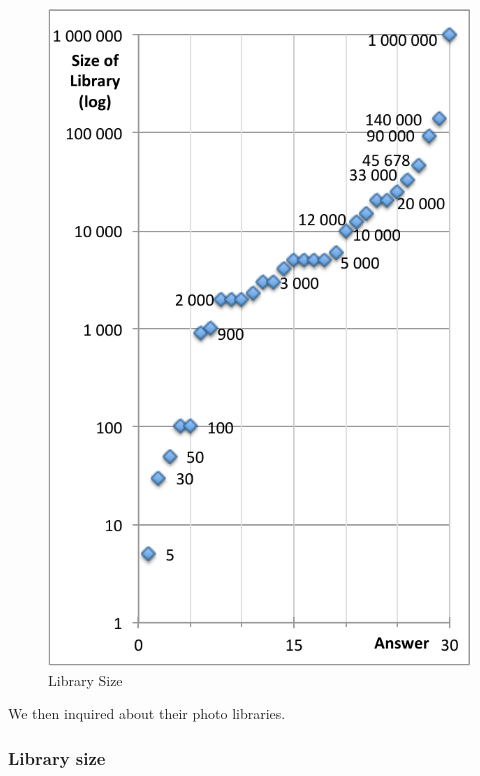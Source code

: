\begin{figure}
	\vspace{-20pt}
	\begin{center}
		\includegraphics[width=\linewidth]{Figures/survey/libsize}
	\end{center}
	\vspace{-20pt}
	\caption{Library Size}
	\vspace{-70pt}
	\label{fig:us:desc}
\end{figure}

We then inquired about their photo libraries.
\vspace{\baselineskip}

\subsubsection{Library size} %
\label{ssub:library_size}

